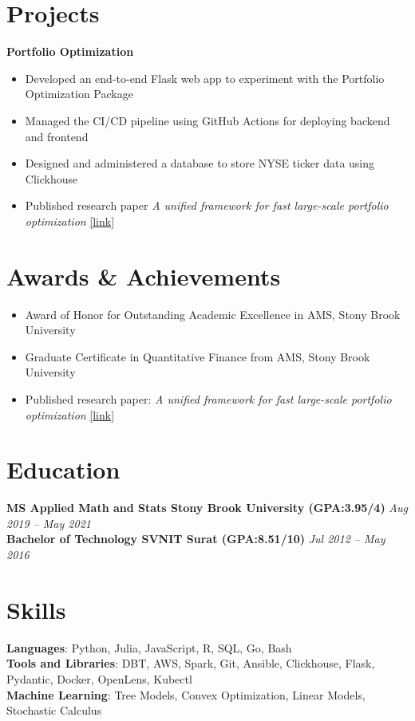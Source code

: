 \documentclass[letterpaper,10pt]{article}
\begin{document}
\section*{Projects}
\textbf{{Portfolio Optimization}}
\begin{itemize}
    \item Developed an end-to-end Flask web app to experiment with the Portfolio Optimization Package
    \item Managed the CI/CD pipeline using GitHub Actions for deploying backend and frontend
    \item Designed and administered a database to store NYSE ticker data using Clickhouse
    \item Published research paper \textit{{A unified framework for fast large-scale portfolio optimization}} \href{{https://arxiv.org/abs/2303.12751}}{{[link]}}
\end{itemize}
\section*{Awards \& Achievements}
\begin{itemize}
    \item Award of Honor for Outstanding Academic Excellence in AMS, Stony Brook University
    \item Graduate Certificate in Quantitative Finance from AMS, Stony Brook University
    \item Published research paper: \textit{A unified framework for fast large-scale portfolio optimization} \href{https://arxiv.org/abs/2303.12751}{[link]}
\end{itemize}
\section*{Education}
\textbf{{MS Applied Math and Stats Stony Brook University (GPA:3.95/4)}} \hfill \textit{{Aug 2019 -- May 2021}} \\
\textbf{{Bachelor of Technology SVNIT Surat (GPA:8.51/10)}} \hfill \textit{{Jul 2012 -- May 2016}} 
\section*{Skills}
\textbf{{Languages}}: Python, Julia, JavaScript, R, SQL, Go, Bash\\
\textbf{{Tools and Libraries}}: DBT, AWS, Spark, Git, Ansible, Clickhouse, Flask, Pydantic, Docker, OpenLens, Kubectl\\
\textbf{{Machine Learning}}: Tree Models, Convex Optimization, Linear Models, Stochastic Calculus
\end{document}
